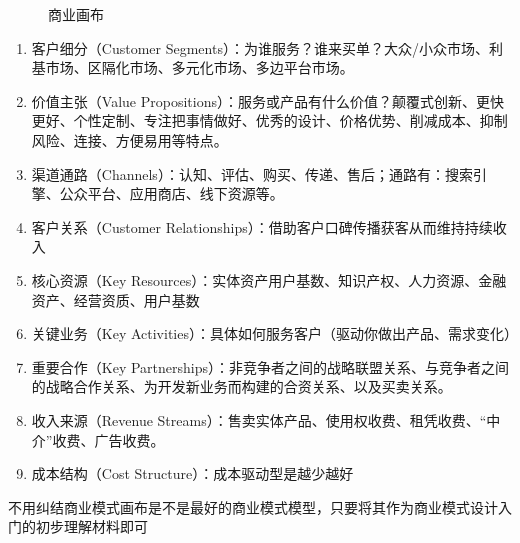 \documentclass[letterpaper,11pt,english]{sphinxmanual}
\begin{document}
\begin{figure}[H]
\centering
\capstart

\noindent{}
\caption{商业画布}\label{\detokenize{chapter_idea/business:id22}}\end{figure}
\begin{enumerate}
%
\item {} 
客户细分（Customer
Segments）：为谁服务？谁来买单？大众/小众市场、利基市场、区隔化市场、多元化市场、多边平台市场。

\item {} 
价值主张（Value
Propositions）：服务或产品有什么价值？颠覆式创新、更快更好、个性定制、专注把事情做好、优秀的设计、价格优势、削减成本、抑制风险、连接、方便易用等特点。

\item {} 
渠道通路（Channels）：认知、评估、购买、传递、售后；通路有：搜索引擎、公众平台、应用商店、线下资源等。

\item {} 
客户关系（Customer
Relationships）：借助客户口碑传播获客从而维持持续收入

\item {} 
核心资源（Key
Resources）：实体资产用户基数、知识产权、人力资源、金融资产、经营资质、用户基数

\item {} 
关键业务（Key
Activities）：具体如何服务客户（驱动你做出产品、需求变化）

\item {} 
重要合作（Key
Partnerships）：非竞争者之间的战略联盟关系、与竞争者之间的战略合作关系、为开发新业务而构建的合资关系、以及买卖关系。

\item {} 
收入来源（Revenue
Streams）：售卖实体产品、使用权收费、租凭收费、“中介”收费、广告收费。

\item {} 
成本结构（Cost Structure）：成本驱动型是越少越好

\end{enumerate}

不用纠结商业模式画布是不是最好的商业模式模型，只要将其作为商业模式设计入门的初步理解材料即可
%
\begin{footnote}[119]\sphinxAtStartFootnote
{}
%
\end{footnote}
\end{document}
